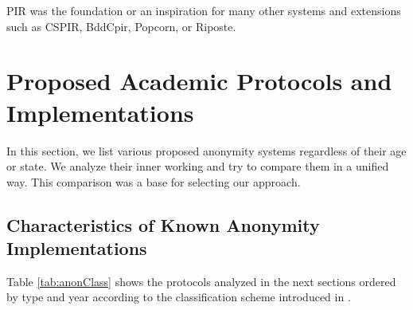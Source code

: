PIR was the foundation or an inspiration for many other systems and extensions such as CSPIR\cite{lipmaa2009first}, BddCpir\cite{lipmaa2009first}, Popcorn\cite{gupta2016scalable}, or Riposte\cite{corrigan2015riposte}.

\chapter[Academic Protocols and Implementations]{Proposed Academic Protocols and Implementations}\label{sec:implSystems}
In this section, we list various proposed anonymity systems regardless of their age or state. We analyze their inner working and try to compare them in a unified way. This comparison was a base for selecting our approach.


\section{Characteristics of Known Anonymity Implementations}
Table \ref{tab:anonClass} shows the protocols analyzed in the next sections ordered by type and year according to the classification scheme introduced in \cite{Shirazi2018}.

\gdef\cc{}
\gdef\cols{
	\ifx\cc\empty
		\gdef\cc{not empty}
	\else
		\gdef\cc{}
	\fi
	\col
}
\gdef\col{%
\ifx\cc\empty%
\cellcolor{black!30}%
\else%
\cellcolor{black!10}%
\fi}
	
